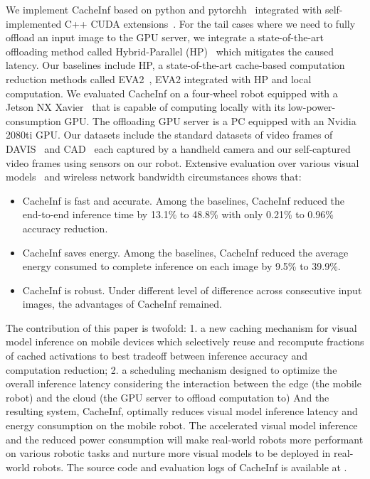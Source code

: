 We implement CacheInf based on python and pytorchh~\cite{paszke2017automatic} integrated with self-implemented C++ CUDA extensions~\cite{cuda}.
For the tail cases where we need to fully offload an input image to the GPU server, we integrate a state-of-the-art offloading method called Hybrid-Parallel (HP)~\cite{sun2024hybridparallel} which mitigates the caused latency.
Our baselines include HP, a state-of-the-art cache-based computation reduction methods called EVA2~\cite{buckler_eva_2018}, EVA2 integrated with HP and local computation.
We evaluated CacheInf on a four-wheel robot equipped with a Jetson NX Xavier~\cite{jetsonnx} that is capable of computing locally with its low-power-consumption GPU.
The offloading GPU server is a PC equipped with an Nvidia 2080ti GPU.
Our datasets include the standard datasets of video frames of DAVIS~\cite{Perazzi2016} and CAD~\cite{Choi_VSWS_2009} each captured by a handheld camera and our self-captured video frames using sensors on our robot.
Extensive evaluation over various visual models~\cite{kapao,agrnav,noauthor_torchvision_nodate} and wireless network bandwidth circumstances shows that:
\begin{itemize}
    \item CacheInf is fast and accurate. Among the baselines, CacheInf reduced the end-to-end inference time by 13.1\% to 48.8\% with only 0.21\% to 0.96\% accuracy reduction.
    \item CacheInf saves energy. Among the baselines, CacheInf reduced the average energy consumed to complete inference on each image by 9.5\% to 39.9\%.
    \item CacheInf is robust. Under different level of difference across consecutive input images, the advantages of CacheInf remained.
\end{itemize}

The contribution of this paper is twofold: 1. a new caching mechanism for visual model inference on mobile devices which selectively reuse and recompute fractions of cached activations to best tradeoff between inference accuracy and computation reduction; 2. a scheduling mechanism designed to optimize the overall inference latency considering the interaction between the edge (the mobile robot) and the cloud (the GPU server to offload computation to)
And the resulting system, CacheInf, optimally reduces visual model inference latency and energy consumption on the mobile robot.
The accelerated visual model inference and the reduced power consumption will make real-world robots more performant on various robotic tasks and nurture more visual models to be deployed in real-world robots.
The source code and evaluation logs of CacheInf is available at .

